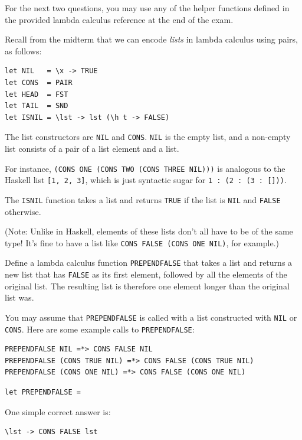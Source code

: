\documentclass[addpoints]{exam}
\begin{document}
\begin{questions}
\newpage

For the next two questions, you may use any of the helper functions defined in the provided lambda calculus reference at the end of the exam.

Recall from the midterm that we can encode \emph{lists} in lambda calculus using pairs, as follows:

\begin{verbatim}
let NIL   = \x -> TRUE
let CONS  = PAIR
let HEAD  = FST
let TAIL  = SND
let ISNIL = \lst -> lst (\h t -> FALSE)
\end{verbatim}

The list constructors are \texttt{NIL} and \texttt{CONS}.  \texttt{NIL} is the empty list, and a non-empty list consists of a pair of a list element and a list.

For instance, \texttt{(CONS ONE (CONS TWO (CONS THREE NIL)))} is analogous to the Haskell list \texttt{[1, 2, 3]}, which is just syntactic sugar for \texttt{1 : (2 : (3 : []))}.

The \texttt{ISNIL} function takes a list and returns \texttt{TRUE} if the list is \texttt{NIL} and \texttt{FALSE} otherwise.

(Note: Unlike in Haskell, elements of these lists don't all have to be of the same type!  It's fine to have a list like \texttt{CONS FALSE (CONS ONE NIL)}, for example.)

\question[2]

Define a lambda calculus function \texttt{PREPENDFALSE} that takes a list and returns a new list that has \texttt{FALSE} as its first element, followed by all the elements of the original list.  The resulting list is therefore one element longer than the original list was.

You may assume that \texttt{PREPENDFALSE} is called with a list constructed with \texttt{NIL} or \texttt{CONS}.  Here are some example calls to \texttt{PREPENDFALSE}:

\begin{verbatim}
PREPENDFALSE NIL =*> CONS FALSE NIL
PREPENDFALSE (CONS TRUE NIL) =*> CONS FALSE (CONS TRUE NIL)
PREPENDFALSE (CONS ONE NIL) =*> CONS FALSE (CONS ONE NIL)
\end{verbatim}

\begin{verbatim}
let PREPENDFALSE = 
\end{verbatim}
\begin{solutionorbox}[1.5in]
One simple correct answer is:
\begin{verbatim}
\lst -> CONS FALSE lst
\end{verbatim}
\end{solutionorbox}


\end{questions}
\end{document}

